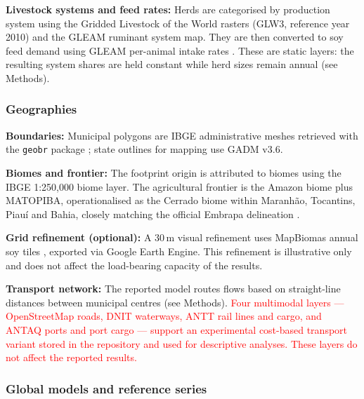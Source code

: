 \documentclass[pdflatex,sn-nature]{sn-jnl}%
\begin{document}
\textbf{Livestock systems and feed rates:} Herds are categorised by production system using the Gridded Livestock of the World rasters (GLW3, reference year 2010) \cite{gilbert2018glw} and the GLEAM ruminant system map. They are then converted to soy feed demand using GLEAM per-animal intake rates \cite{fao2018gleam}. These are static layers: the resulting system shares are held constant while herd sizes remain annual (see Methods).

\subsubsection{Geographies}\label{subsec:geo}

\textbf{Boundaries:} Municipal polygons are IBGE administrative meshes
retrieved with the \texttt{geobr} package \cite{pereira2019geobr}; state
outlines for mapping use GADM v3.6.

\textbf{Biomes and frontier:} The footprint origin is attributed to biomes using the IBGE 1:250{,}000 biome layer. The agricultural frontier is the Amazon biome plus MATOPIBA, operationalised as the Cerrado biome within Maranh\~ao, Tocantins, Piau\'i and Bahia, closely matching the official Embrapa delineation \cite{miranda2014matopiba}.

\textbf{Grid refinement (optional):} A 30\,m visual refinement uses
MapBiomas annual soy tiles \cite{souza2020mapbiomas}, exported via Google
Earth Engine. This refinement is illustrative only and does not affect the load-bearing capacity of the results.

\textbf{Transport network:} The reported model routes flows based on straight-line distances between municipal centres (see Methods). \textcolor{red}{Four multimodal layers — OpenStreetMap roads, DNIT waterways, ANTT rail lines and cargo, and ANTAQ ports and port cargo — support an experimental cost-based transport variant stored in the repository and used for descriptive analyses. These layers do not affect the reported results.}

\subsubsection{Global models and reference series}\label{subsec:mrio-data}
\end{document}
